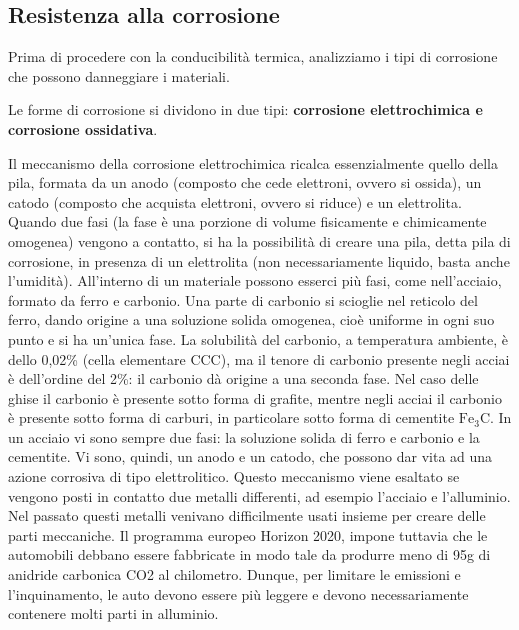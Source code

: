 \subsection{Resistenza alla corrosione}

Prima di procedere con la conducibilità termica, analizziamo i tipi di corrosione che possono danneggiare i materiali.

Le forme di corrosione si dividono in due tipi: \textbf{corrosione elettrochimica e corrosione ossidativa}.

Il meccanismo della corrosione elettrochimica ricalca essenzialmente quello della pila, formata da un anodo (composto che cede elettroni, ovvero si ossida), un catodo (composto che acquista elettroni, ovvero si riduce) e un elettrolita.
Quando due fasi (la fase è una porzione di volume fisicamente e chimicamente omogenea) vengono a contatto, si ha la possibilità di creare una pila, detta pila di corrosione, in presenza di un elettrolita (non necessariamente liquido, basta anche l’umidità).
All’interno di un materiale possono esserci più fasi, come nell’acciaio, formato da ferro e carbonio. Una parte di carbonio si scioglie nel reticolo del ferro, dando origine a una soluzione solida omogenea, cioè uniforme in ogni suo punto e si ha un’unica fase.
La solubilità del carbonio, a temperatura ambiente, è dello 0,02\% (cella elementare CCC), ma il tenore di carbonio presente negli acciai è dell’ordine del 2\%: il carbonio dà origine a una seconda fase. Nel caso delle ghise il carbonio è presente sotto forma di grafite, mentre negli acciai il carbonio è presente sotto forma di carburi, in particolare sotto forma di cementite $\mathrm{Fe_3C}$. In un acciaio vi sono sempre due fasi: la soluzione solida di ferro e carbonio e la cementite. Vi sono, quindi, un anodo e un catodo, che possono dar vita ad una azione corrosiva di tipo elettrolitico. Questo meccanismo viene esaltato se vengono posti in contatto due metalli differenti, ad esempio l’acciaio e l’alluminio.\\
Nel passato questi metalli venivano difficilmente usati insieme per creare delle parti meccaniche. Il programma europeo Horizon 2020, impone tuttavia che le automobili debbano essere fabbricate in modo tale da produrre meno di 95g di anidride carbonica CO2 al chilometro. Dunque, per limitare le emissioni e l’inquinamento, le auto devono essere più leggere e devono necessariamente contenere molti parti in alluminio.\\
